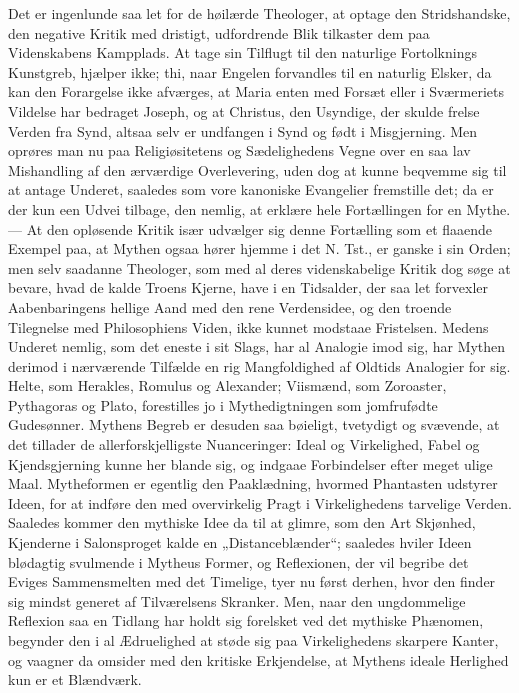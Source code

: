 \documentclass[12pt,a4paper]{book}
\begin{document}
Det er ingenlunde saa let for de høilærde Theologer, at optage den
Stridshandske, den negative Kritik med dristigt, udfordrende Blik tilkaster
dem paa Videnskabens Kampplads. At tage sin Tilflugt til den naturlige
Fortolknings Kunstgreb, hjælper ikke; thi, naar Engelen forvandles til en
naturlig Elsker, da kan den Forargelse ikke afværges, at Maria enten med
Forsæt eller i Sværmeriets Vildelse har bedraget Joseph, og at Christus, den
Usyndige, der skulde frelse Verden fra Synd, altsaa selv er undfangen i Synd
og født i Misgjerning. Men oprøres man nu paa Religiøsitetens og
Sædelighedens Vegne over en saa lav Mishandling af den ærværdige
Overlevering, uden dog at kunne beqvemme sig til at antage Underet, saaledes
som vore kanoniske Evangelier fremstille det; da er der kun een Udvei
tilbage, den nemlig, at erklære hele Fortællingen for en Mythe. --- At den
opløsende Kritik især udvælger sig denne Fortælling som et flaaende Exempel
paa, at Mythen ogsaa hører hjemme i det N. Tst., er ganske i sin Orden; men
selv saadanne Theologer, som med al deres videnskabelige Kritik dog søge at
bevare, hvad de kalde Troens Kjerne, have i en Tidsalder, der saa let
forvexler Aabenbaringens hellige Aand med den rene Verdensidee, og den
troende Tilegnelse med Philosophiens Viden, ikke kunnet modstaae Fristelsen.
Medens Underet nemlig, som det eneste i sit Slags, har al Analogie imod sig,
har Mythen
derimod i nærværende Tilfælde en rig Mangfoldighed af Oldtids Analogier for
sig. Helte, som Herakles, Romulus og Alexander; Viismænd, som Zoroaster,
Pythagoras og Plato, forestilles jo i Mythedigtningen som jomfrufødte
Gudesønner. Mythens Begreb er desuden saa bøieligt, tvetydigt og svævende, at
det tillader de allerforskjelligste Nuanceringer: Ideal og Virkelighed, Fabel
og Kjendsgjerning kunne her blande sig, og indgaae Forbindelser efter meget
ulige Maal. Mytheformen er egentlig den Paaklædning, hvormed Phantasten
udstyrer Ideen, for at indføre den med overvirkelig Pragt i Virkelighedens
tarvelige Verden. Saaledes kommer den mythiske Idee da til at glimre, som den
Art Skjønhed, Kjenderne i Salonsproget kalde en „Distanceblænder“; saaledes
hviler Ideen blødagtig svulmende i Mytheus Former, og Reflexionen, der vil
begribe det Eviges Sammensmelten med det Timelige, tyer nu først derhen, hvor
den finder sig mindst generet af Tilværelsens Skranker. Men, naar den
ungdommelige Reflexion saa en Tidlang har holdt sig forelsket ved det
mythiske Phænomen, begynder den i al Ædruelighed at støde sig paa
Virkelighedens skarpere Kanter, og vaagner da omsider med den kritiske
Erkjendelse, at Mythens ideale Herlighed kun er et Blændværk.
\end{document}
